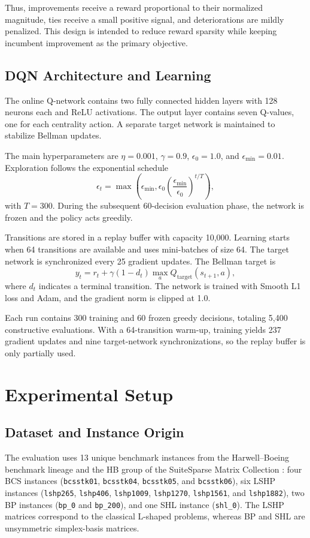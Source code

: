 \documentclass[runningheads]{llncs}
\begin{document}
Thus, improvements receive a reward proportional to their normalized magnitude, ties receive a small positive signal, and deteriorations are mildly penalized. This design is intended to reduce reward sparsity while keeping incumbent improvement as the primary objective.

\subsection{DQN Architecture and Learning}

The online Q-network contains two fully connected hidden layers with 128 neurons each and ReLU activations. The output layer contains seven Q-values, one for each centrality action. A separate target network is maintained to stabilize Bellman updates.

The main hyperparameters are $\eta = 0.001$, $\gamma = 0.9$, $\epsilon_0 = 1.0$, and $\epsilon_{\min}=0.01$. Exploration follows the exponential schedule
\[
\epsilon_t=\max\!\left(\epsilon_{\min},
\epsilon_0\left(\frac{\epsilon_{\min}}{\epsilon_0}\right)^{t/T}\right),
\]
with $T=300$. During the subsequent 60-decision evaluation phase, the network is frozen and the policy acts greedily.

Transitions are stored in a replay buffer with capacity 10,000. Learning starts when 64 transitions are available and uses mini-batches of size 64. The target network is synchronized every 25 gradient updates. The Bellman target is
\[
y_t = r_t + \gamma (1-d_t)\max_a Q_{\mathrm{target}}(s_{t+1},a),
\]
where $d_t$ indicates a terminal transition. The network is trained with Smooth L1 loss and Adam, and the gradient norm is clipped at 1.0.

Each run contains 300 training and 60 frozen greedy decisions, totaling 5,400 constructive evaluations. With a 64-transition warm-up, training yields 237 gradient updates and nine target-network synchronizations, so the replay buffer is only partially used.

\section{Experimental Setup}

\subsection{Dataset and Instance Origin}

The evaluation uses 13 unique benchmark instances from the Harwell--Boeing benchmark lineage and the HB group of the SuiteSparse Matrix Collection \cite{davis2011,duff1989}: four BCS instances (\texttt{bcsstk01}, \texttt{bcsstk04}, \texttt{bcsstk05}, and \texttt{bcsstk06}), six LSHP instances (\texttt{lshp265}, \texttt{lshp406}, \texttt{lshp1009}, \texttt{lshp1270}, \texttt{lshp1561}, and \texttt{lshp1882}), two BP instances (\texttt{bp\_0} and \texttt{bp\_200}), and one SHL instance (\texttt{shl\_0}). The LSHP matrices correspond to the classical L-shaped problems, whereas BP and SHL are unsymmetric simplex-basis matrices.
\end{document}
